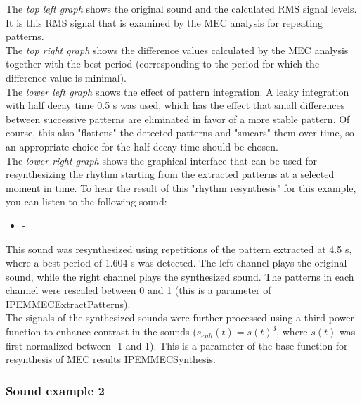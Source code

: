 The \emph{top left graph} shows the original sound and the
calculated RMS signal levels. It is this RMS signal that is
examined by the MEC analysis for repeating patterns.\\

The \emph{top right graph} shows the difference values calculated
by the MEC analysis together with the best period (corresponding
to the period for which the difference value is minimal).\\

The \emph{lower left graph} shows the effect of pattern
integration. A leaky integration with half decay time 0.5 s was
used, which has the effect that small differences between
successive patterns are eliminated in favor of a more stable
pattern. Of course, this also "flattens" the detected patterns and
"smears" them over time, so an appropriate choice for the half
decay time should be chosen.\\

The \emph{lower right graph} shows the graphical interface that
can be used for resynthesizing the rhythm starting from the
extracted patterns at a selected moment in time. To hear the
result of this "rhythm resynthesis" for this example, you can
listen to the following sound:
\begin{itemize}
\item[] - 
\end{itemize}
This sound was resynthesized using repetitions of the pattern
extracted at 4.5 s, where a best period of 1.604 s was detected.
The left channel plays the original sound, while the right channel
plays the synthesized sound. The patterns in each channel were
rescaled between 0 and 1 (this is a parameter
of \hyperlink{FuncRef:IPEMMECExtractPatterns}{IPEMMECExtractPatterns}).\\

The signals of the synthesized sounds were further processed using
a third power function to enhance contrast in the sounds
($s_{enh}(t) = s(t)^3$, where $s(t)$ was first normalized between
-1 and 1). This is a parameter of the base function for
resynthesis of MEC results \hyperlink{FuncRef:IPEMMECSynthesis}{IPEMMECSynthesis}.\\


\subsubsection*{Sound example 2}

